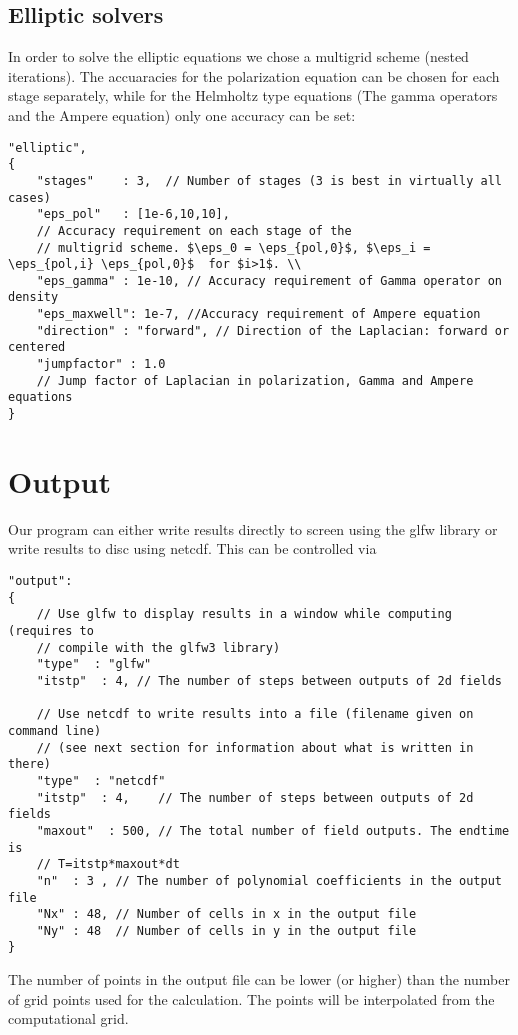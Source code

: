 \subsection{Elliptic solvers}
In order to solve the elliptic equations we chose a multigrid scheme (nested
iterations). The accuaracies for the polarization equation can be chosen for
each stage separately, while for the Helmholtz type equations (The gamma
operators and the Ampere equation) only one accuracy can be set:
\begin{verbatim}
"elliptic",
{
    "stages"    : 3,  // Number of stages (3 is best in virtually all cases)
    "eps_pol"   : [1e-6,10,10],
    // Accuracy requirement on each stage of the
    // multigrid scheme. $\eps_0 = \eps_{pol,0}$, $\eps_i = \eps_{pol,i} \eps_{pol,0}$  for $i>1$. \\
    "eps_gamma" : 1e-10, // Accuracy requirement of Gamma operator on density
    "eps_maxwell": 1e-7, //Accuracy requirement of Ampere equation
    "direction" : "forward", // Direction of the Laplacian: forward or centered
    "jumpfactor" : 1.0
    // Jump factor of Laplacian in polarization, Gamma and Ampere equations
}
\end{verbatim}

\section{Output}
Our program can either write results directly to screen using the glfw library
or write results to disc using netcdf.
This can be controlled via
\begin{verbatim}
"output":
{
    // Use glfw to display results in a window while computing (requires to
    // compile with the glfw3 library)
    "type"  : "glfw"
    "itstp"  : 4, // The number of steps between outputs of 2d fields

    // Use netcdf to write results into a file (filename given on command line)
    // (see next section for information about what is written in there)
    "type"  : "netcdf"
    "itstp"  : 4,    // The number of steps between outputs of 2d fields
    "maxout"  : 500, // The total number of field outputs. The endtime is
    // T=itstp*maxout*dt
    "n"  : 3 , // The number of polynomial coefficients in the output file
    "Nx" : 48, // Number of cells in x in the output file
    "Ny" : 48  // Number of cells in y in the output file
}
\end{verbatim}
The number of points in the output file can be lower (or higher) than the number of
grid points used for the calculation. The points will be interpolated from the
computational grid.
